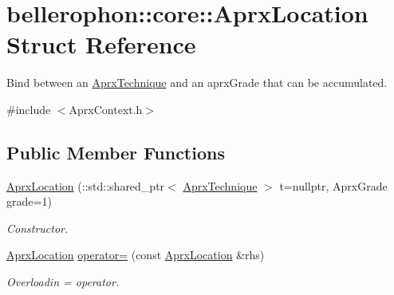 \hypertarget{structbellerophon_1_1core_1_1AprxLocation}{}\section{bellerophon\+:\+:core\+:\+:Aprx\+Location Struct Reference}
\label{structbellerophon_1_1core_1_1AprxLocation}


Bind between an \hyperlink{classbellerophon_1_1core_1_1AprxTechnique}{Aprx\+Technique} and an aprx\+Grade that can be \textquotesingle{}accumulated\textquotesingle{}.  




{\ttfamily \#include $<$Aprx\+Context.\+h$>$}

\subsection*{Public Member Functions}
\begin{DoxyCompactItemize}
\item 
\hypertarget{structbellerophon_1_1core_1_1AprxLocation_a1639629d8fdc338b5f5fac77a954cbf0}{}\label{structbellerophon_1_1core_1_1AprxLocation_a1639629d8fdc338b5f5fac77a954cbf0} 
\hyperlink{structbellerophon_1_1core_1_1AprxLocation_a1639629d8fdc338b5f5fac77a954cbf0}{Aprx\+Location} (\+::std\+::shared\+\_\+ptr$<$ \hyperlink{classbellerophon_1_1core_1_1AprxTechnique}{Aprx\+Technique} $>$ t=nullptr, Aprx\+Grade grade=1)
\begin{DoxyCompactList}\small\item\em Constructor. \end{DoxyCompactList}\item 
\hypertarget{structbellerophon_1_1core_1_1AprxLocation_aac6ebc2d39f3991c9154134a9ff172bf}{}\label{structbellerophon_1_1core_1_1AprxLocation_aac6ebc2d39f3991c9154134a9ff172bf} 
\hyperlink{structbellerophon_1_1core_1_1AprxLocation}{Aprx\+Location} \hyperlink{structbellerophon_1_1core_1_1AprxLocation_aac6ebc2d39f3991c9154134a9ff172bf}{operator=} (const \hyperlink{structbellerophon_1_1core_1_1AprxLocation}{Aprx\+Location} \&rhs)
\begin{DoxyCompactList}\small\item\em Overloadin = operator. \end{DoxyCompactList}\end{DoxyCompactItemize}
